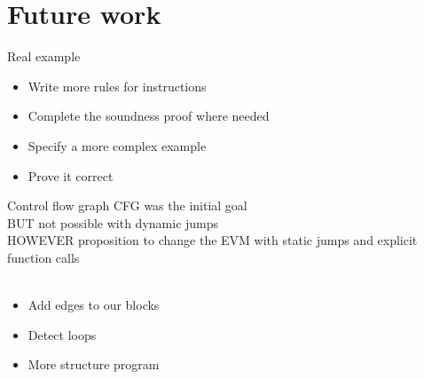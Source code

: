 \documentclass{beamer}
\begin{document}
\part{Future work}
\frame{\partpage}

\begin{frame}{Real example}
	\begin{itemize}
		\item Write more rules for instructions
		\item Complete the soundness proof where needed
		\item Specify a more complex example
		\item Prove it correct
	\end{itemize}
\end{frame}

\begin{frame}{Control flow graph}
	CFG was the initial goal\\
	BUT not possible with dynamic jumps\\
	HOWEVER proposition to change the EVM with static jumps and explicit function calls
	\\~\\
	\begin{itemize}
		\item Add edges to our blocks
		\item Detect loops
		\item More structure program
	\end{itemize}
\end{frame}



\end{document}
